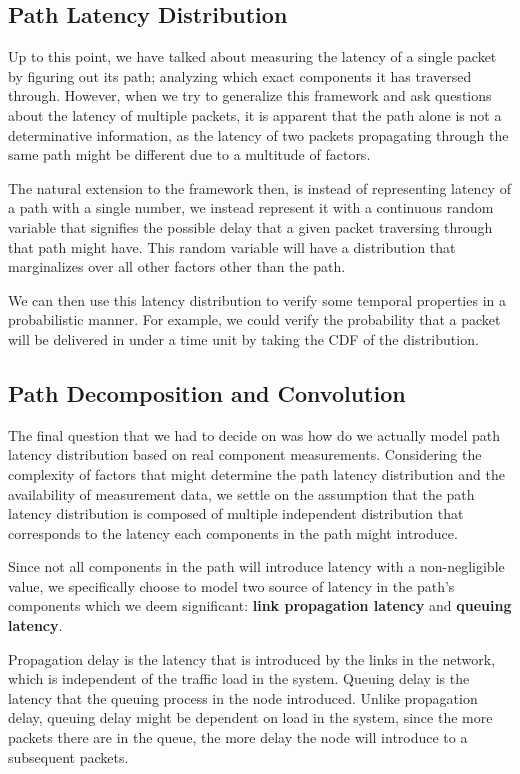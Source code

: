 \documentclass[10pt,sigconf,letterpaper,anonymous,nonacm]{acmart}
\begin{document}
\subsection{Path Latency Distribution}
Up to this point, we have talked about measuring the latency of a single packet by figuring out 
its path; analyzing which exact components it has traversed through.
However, when we try to generalize this framework and ask questions about the latency of multiple 
packets, it is apparent that the path alone is not a determinative information, as the latency 
of two packets propagating through the same path might be different due to a multitude of factors.

The natural extension to the framework then, is instead of representing latency of a path with a 
single number, we instead represent it with a continuous random variable that signifies the 
possible delay that a given packet traversing through that path might have.
This random variable will have a distribution that marginalizes over all other factors other than 
the path.

We can then use this latency distribution to verify some temporal properties in a probabilistic 
manner.
For example, we could verify the probability that a packet will be delivered in under a time 
unit by taking the CDF of the distribution.

\subsection{Path Decomposition and Convolution} \label{decomposition}
The final question that we had to decide on was how do we actually model path latency distribution
based on real component measurements.
Considering the complexity of factors that might determine the path latency distribution and the 
availability of measurement data, we settle on the assumption that the path latency distribution 
is composed of multiple independent distribution that corresponds to the latency each components 
in the path might introduce.

Since not all components in the path will introduce latency with a non-negligible value, we 
specifically choose to model two source of latency in the path's components which we deem 
significant: \textbf{link propagation latency} and \textbf{queuing latency}.

Propagation delay is the latency that is introduced by the links in the network, which is 
independent of the traffic load in the system.
Queuing delay is the latency that the queuing process in the node introduced. 
Unlike propagation delay, queuing delay might be dependent on load in the system, since the more 
packets there are in the queue, the more delay the node will introduce to a subsequent packets.
\end{document}
